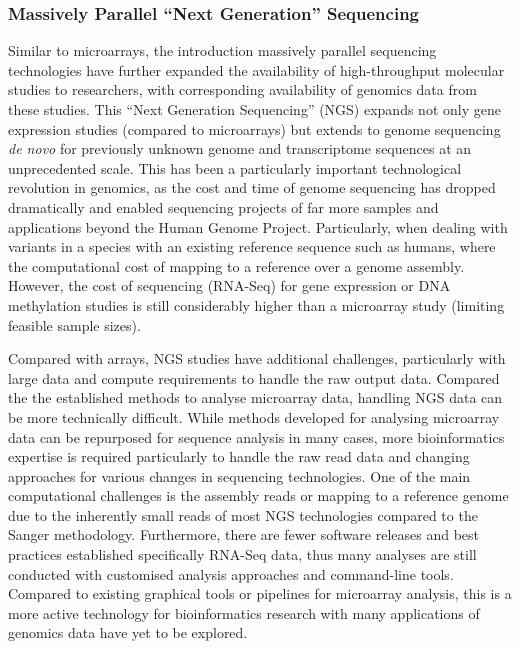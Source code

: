 \subsubsection{Massively Parallel ``Next Generation'' Sequencing}
Similar to microarrays, the introduction massively parallel sequencing technologies have further expanded the availability of high-throughput molecular studies to researchers, with corresponding availability of genomics data from these studies. This ``Next Generation Sequencing'' (NGS) expands not only gene expression studies (compared to microarrays) but extends to genome sequencing \textit{de novo} for previously unknown genome and transcriptome sequences at an unprecedented scale. This has been a particularly important technological revolution in genomics, as the cost and time of genome sequencing has dropped dramatically and enabled sequencing projects of far more samples and applications beyond the Human Genome Project. Particularly, when dealing with variants in a species with an existing reference sequence such as humans, where the computational cost of mapping to a reference over a genome assembly. However, the cost of sequencing (RNA-Seq) for gene expression or DNA methylation studies is still considerably higher than a microarray study (limiting feasible sample sizes).

Compared with arrays, NGS studies have additional challenges, particularly with large data and compute requirements to handle the raw output data. Compared the the established methods to analyse microarray data, handling NGS data can be more technically difficult. While methods developed for analysing microarray data can be repurposed for sequence analysis in many cases, more bioinformatics expertise is required particularly to handle the raw read data and changing approaches for various changes in sequencing technologies. One of the main computational challenges is the assembly reads or mapping to a reference genome due to the inherently small reads of most NGS technologies compared to the Sanger methodology. Furthermore, there are fewer software releases and best practices established specifically RNA-Seq data, thus many analyses are still conducted with customised analysis approaches and command-line tools. Compared to existing graphical tools or pipelines for microarray analysis, this is a more active technology for bioinformatics research with many applications of genomics data have yet to be explored.

